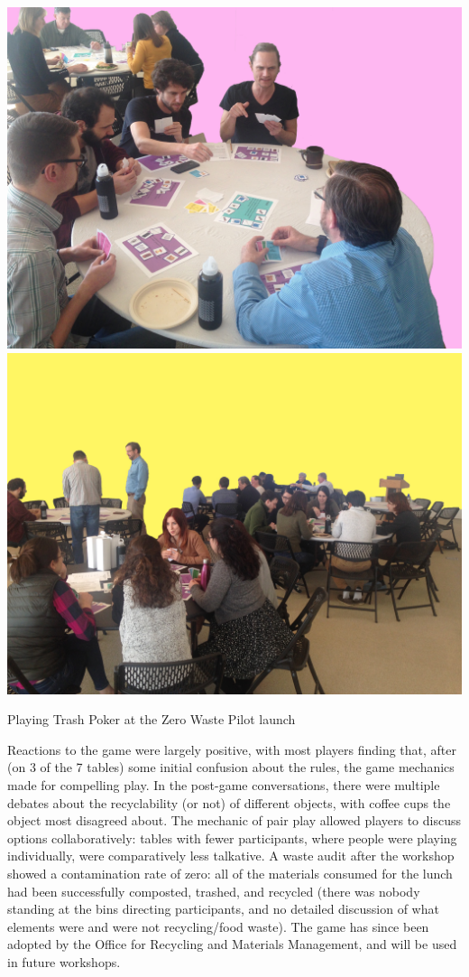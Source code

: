 \documentclass[nofonts,nols,justified,nobib]{tufte-book}
\begin{document}
\begin{marginfigure}
  \includegraphics[width=1\linewidth]{img/3/cardgame-workshop/workshop-pink.jpeg}
  \includegraphics[width=1\linewidth]{img/3/cardgame-workshop/workshop-yellow.jpg}
  \caption{Playing Trash Poker at the Zero Waste Pilot launch}
\end{marginfigure}

Reactions to the game were largely positive, with most players finding that, after (on 3 of the 7 tables) some initial confusion about the rules, the game mechanics made for compelling play. In the post-game conversations, there were multiple debates about the recyclability (or not) of different objects, with coffee cups the object most disagreed about. The mechanic of pair play allowed players to discuss options collaboratively: tables with fewer participants, where people were playing individually, were comparatively less talkative. A waste audit after the workshop showed a contamination rate of zero: all of the materials consumed for the lunch had been successfully composted, trashed, and recycled (there was nobody standing at the bins directing participants, and no detailed discussion of what elements were and were not recycling/food waste). The game has since been adopted by the Office for Recycling and Materials Management, and will be used in future workshops. 
\end{document}
